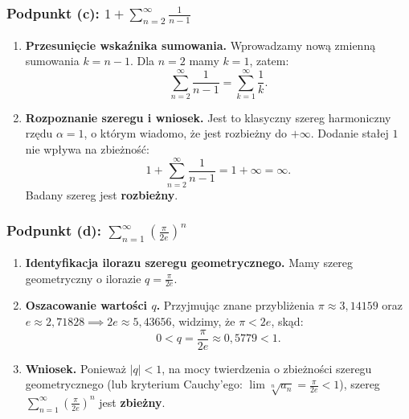 \subsubsection*{Podpunkt (c): $\displaystyle 1 + \sum_{n=2}^{\infty} \frac{1}{n-1}$}

\begin{enumerate}[label=\textbf{Krok \arabic*.},leftmargin=*]
    \item \textbf{Przesunięcie wskaźnika sumowania.}
    Wprowadzamy nową zmienną sumowania $k = n - 1$. Dla $n = 2$ mamy $k = 1$, zatem:
    \begin{equation*}
        \sum_{n=2}^{\infty} \frac{1}{n-1} = \sum_{k=1}^{\infty} \frac{1}{k}.
    \end{equation*}
    \item \textbf{Rozpoznanie szeregu i wniosek.}
    Jest to klasyczny szereg harmoniczny rzędu $\alpha = 1$, o którym wiadomo, że jest rozbieżny do $+\infty$. Dodanie stałej $1$ nie wpływa na zbieżność:
    \begin{equation*}
        1 + \sum_{n=2}^{\infty} \frac{1}{n-1} = 1 + \infty = \infty.
    \end{equation*}
    Badany szereg jest \textbf{rozbieżny}.
\end{enumerate}

\subsubsection*{Podpunkt (d): $\displaystyle \sum_{n=1}^{\infty} \left(\frac{\pi}{2e}\right)^n$}

\begin{enumerate}[label=\textbf{Krok \arabic*.},leftmargin=*]
    \item \textbf{Identyfikacja ilorazu szeregu geometrycznego.}
    Mamy szereg geometryczny o ilorazie $q = \frac{\pi}{2e}$.
    \item \textbf{Oszacowanie wartości $q$.}
    Przyjmując znane przybliżenia $\pi \approx 3{,}14159$ oraz $e \approx 2{,}71828 \implies 2e \approx 5{,}43656$, widzimy, że $\pi < 2e$, skąd:
    \begin{equation*}
        0 < q = \frac{\pi}{2e} \approx 0{,}5779 < 1.
    \end{equation*}
    \item \textbf{Wniosek.}
    Ponieważ $|q| < 1$, na mocy twierdzenia o zbieżności szeregu geometrycznego (lub kryterium Cauchy'ego: $\lim \sqrt[n]{a_n} = \frac{\pi}{2e} < 1$), szereg $\displaystyle\sum_{n=1}^{\infty} \left(\frac{\pi}{2e}\right)^n$ jest \textbf{zbieżny}.
\end{enumerate}

